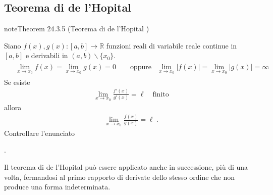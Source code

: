 \documentclass[letterpaper,10pt,italian]{jupyterBook}
\begin{document}
\subsection{Teorema di de l’Hopital}
\label{\detokenize{ch/infinitesimal_calculus/derivatives:teorema-di-de-l-hopital}}\label{\detokenize{ch/infinitesimal_calculus/derivatives:infinitesimal-calculus-derivatives-thm-hopital}}\label{ch/infinitesimal_calculus/derivatives:thm:infinitesimal-calculus:derivatives:thm:hopital}
\begin{sphinxadmonition}{note}{Theorem 24.3.5 (Teorema di de l’Hopital )}



\sphinxAtStartPar
Siano \(f(x), g(x): [a,b] \rightarrow \mathbb{R}\) funzioni reali di variabile reale continue in \([a,b]\) e derivabili in \((a,b) \backslash \{ x_0 \}\).
\begin{equation*}
\begin{split}\begin{aligned}
  & \lim_{x \rightarrow x_0} f(x) = \lim_{x \rightarrow x_0} g(x) = 0 \qquad \text{oppure}
  & \lim_{x \rightarrow x_0}|f(x)|= \lim_{x \rightarrow x_0}|g(x)|= \infty
\end{aligned}\end{split}
\end{equation*}
\sphinxAtStartPar
Se esiste
\begin{equation*}
\begin{split} \lim_{x \rightarrow x_0} \frac{f'(x)}{g'(x)} = \ell \quad \text{finito}\end{split}
\end{equation*}
\sphinxAtStartPar
allora
\begin{equation*}
\begin{split} \lim_{x \rightarrow x_0} \frac{f(x)}{g(x)} = \ell \ . \end{split}
\end{equation*}
\sphinxAtStartPar
{} Controllare l’enunciato
\end{sphinxadmonition}

\sphinxAtStartPar
{\hyperref[\detokenize{ch/infinitesimal_calculus/derivatives-notes:infinitesimal-calculus-derivatives-thm-hopital-notes}]{}}.

\sphinxAtStartPar
{} Il teorema di de l’Hopital può essere applicato anche in successione, più di una volta, fermandosi al primo rapporto di derivate dello stesso ordine che non produce una forma indeterminata.
\end{document}
